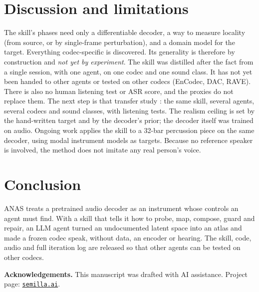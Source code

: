 \documentclass[10pt,twocolumn]{article}
\renewcommand{\paragraph}[1]{\smallskip\noindent\textbf{#1}\;}
\begin{document}
\section{Discussion and limitations}
The skill's phases need only a differentiable decoder, a way to measure locality (from source, or by single-frame perturbation), and a domain model for the target. Everything codec-specific is discovered. Its generality is therefore by construction and \emph{not yet by experiment}. The skill was distilled after the fact from a single session, with one agent, on one codec and one sound class. It has not yet been handed to other agents or tested on other codecs (EnCodec, DAC, RAVE). There is also no human listening test or ASR score, and the proxies do not replace them. The next step is that transfer study \cite{kassis2026mimeo}: the same skill, several agents, several codecs and sound classes, with listening tests. The realism ceiling is set by the hand-written target and by the decoder's prior; the decoder itself was trained on audio. Ongoing work applies the skill to a 32-bar percussion piece on the same decoder, using modal instrument models as targets. Because no reference speaker is involved, the method does not imitate any real person's voice.

\section{Conclusion}
ANAS treats a pretrained audio decoder as an instrument whose controls an agent must find. With a skill that tells it how to probe, map, compose, guard and repair, an LLM agent turned an undocumented latent space into an atlas and made a frozen codec speak, without data, an encoder or hearing. The skill, code, audio and full iteration log are released so that other agents can be tested on other codecs.

\paragraph{Acknowledgements.} This manuscript was drafted with AI assistance. Project page: \href{https://semilla.ai}{\texttt{semilla.ai}}.
\end{document}

